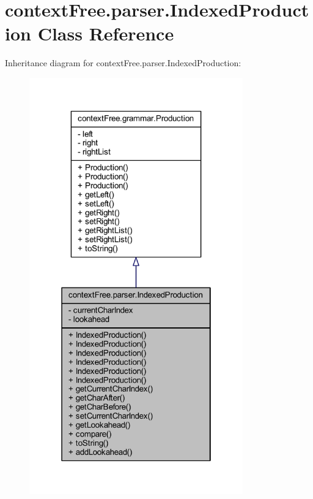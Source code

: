 \hypertarget{classcontext_free_1_1parser_1_1_indexed_production}{\section{context\-Free.\-parser.\-Indexed\-Production Class Reference}
\label{classcontext_free_1_1parser_1_1_indexed_production}
}


Inheritance diagram for context\-Free.\-parser.\-Indexed\-Production\-:\nopagebreak
\begin{figure}[H]
\begin{center}
\leavevmode
\includegraphics[width=262pt]{classcontext_free_1_1parser_1_1_indexed_production__inherit__graph}
\end{center}
\end{figure}


